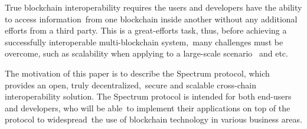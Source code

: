 True blockchain interoperability requires the users and developers have the ability to access information\
from one blockchain inside another without any additional efforts from a third party.
This is a great-efforts task, thus, before achieving a successfully interoperable multi-blockchain system,\
many challenges must be overcome, such as scalability when applying to a large-scale scenario~\cite{Kim2018} and etc.

The motivation of this paper is to describe the Spectrum protocol, which provides an open, truly decentralized,\
secure and scalable cross-chain interoperability solution.
The Spectrum protocol is intended for both end-users and developers, who will be able\
to implement their applications on top of the protocol to widespread\
the use of blockchain technology in various business areas.

